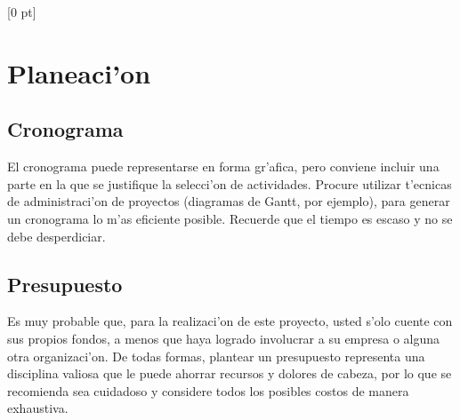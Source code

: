 \titlespacing{\chapter}{0 pt}{30 pt}{50 pt}[0 pt]
\titleformat{\section}{\Large\bfseries}{\thesection}{0 pt}{\hspace{30 pt}}
\titleformat{\subsection}{\large\bfseries}{\thesubsection}{0 pt}{\hspace{30 pt}}
\pagestyle{fancy}
\fancyhead[LO,LE]{\footnotesize\textit{\leftmark}}
\fancyhead[RO,RE]{\thepage}
\fancyfoot[CO,CE]{}

\chapter{Planeaci'on} %

\normalsize

\section{Cronograma}
\noindent
El cronograma puede representarse en forma gr'afica, pero conviene incluir una parte en la que se justifique la selecci'on de actividades. Procure utilizar t'ecnicas de administraci'on de proyectos (diagramas de Gantt, por ejemplo), para generar un cronograma lo m'as eficiente posible. Recuerde que el tiempo es escaso y no se debe desperdiciar.

\section{Presupuesto}
\noindent
Es muy probable que, para la realizaci'on de este proyecto, usted s'olo cuente con sus propios fondos, a menos que haya logrado involucrar a su empresa o alguna otra organizaci'on. De todas formas, plantear un presupuesto representa una disciplina valiosa que le puede ahorrar recursos y dolores de cabeza, por lo que se recomienda sea cuidadoso y considere todos los posibles costos de manera exhaustiva.


